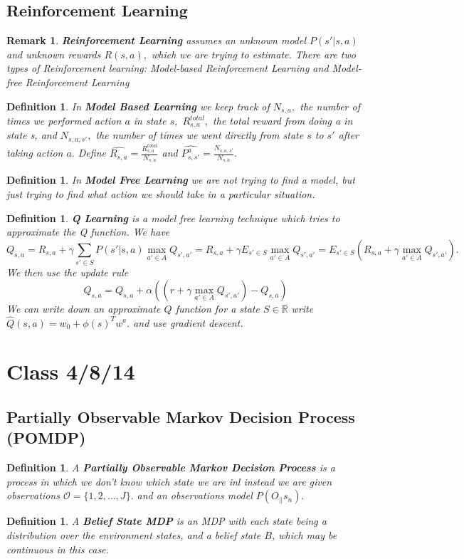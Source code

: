 \documentclass{amsart}
\newtheorem{defn}[subsubsection]{Definition}
\newtheorem{rem}[subsubsection]{Remark}
\newcommand\ssec{\subsection}
\begin{document}
\ssec{Reinforcement Learning}
\begin{rem}
{\bf Reinforcement Learning} assumes an unknown model $P(s'|s,a)$ and unknown rewards $R(s,a),$ which we are trying to estimate. There are two types of Reinforcement learning: Model-based Reinforcement Learning and Model-free Reinforcement Learning 
\end{rem}


\begin{defn}
In {\bf Model Based Learning} we keep track of $N_{s,a},$ the number of times we performed action $a$ in state $s,$ $R^{total}_{s,a},$ the total reward from doing a in state s, and $N_{s,a,s'},$ the number of times we went directly from state $s$ to $s'$ after taking action $a.$ Define $\hat{R_{s,a}} = \frac {R^{total}_{s,a}}{N_{s,a}}$ and $\hat{P^a_{s,s'}} = \frac {N_{s,a,s'}}{N_{s,a}}.$
\end{defn}

\begin{defn}
In {\bf Model Free Learning} we are not trying to find a model, but just trying to find what action we should take in a particular situation.
\end{defn}
\begin{defn}
{\bf Q Learning} is a model free learning technique which tries to approximate the Q function. We have 
$$Q_{s,a} = R_{s,a} + \gamma \sum_{s' \in S} P(s'|s,a) \max_{a' \in A} Q_{s',a'} = R_{s,a} + \gamma E_{s' \in S}\max_{a' \in A} Q_{s',a'} = E_{s' \in S} (R_{s,a} + \gamma \max_{a' \in A} Q_{s',a'}).$$ 
We then use the update rule 
$$Q_{s,a} = Q_{s,a} + \alpha((r+\gamma \max_{a' \in A}Q_{s',a'})- Q_{s,a})$$
We can write down an approximate $Q$ function for a state $S \in \mathbb R$ write $\hat{Q}(s,a) = w_0 + \phi(s)^Tw^a.$ and use gradient descent. 
\end{defn}
\section{Class 4/8/14}
\ssec{Partially Observable Markov Decision Process (POMDP)}
\begin{defn}
A {\bf Partially Observable Markov Decision Process} is a process in which we don't know which state we are inl instead we are given observations $\mathcal O=\{1,2,\ldots,J\}.$ and an observations model $P(O_||s_n).$
\end{defn}
\begin{defn}
A {\bf Belief State MDP} is an MDP with each state being a distribution over the environment states, and a belief state $B$, which may be continuous in this case.
\end{defn}
\end{document}
